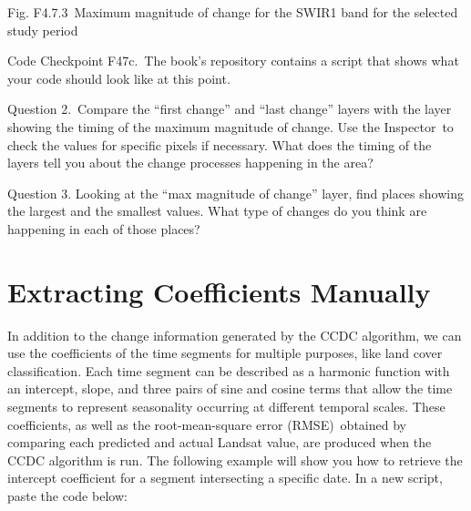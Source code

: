 \documentclass[
  letterpaper,
  DIV=11,
  numbers=noendperiod]{scrreprt}
\begin{document}
Fig. F4.7.3~Maximum magnitude of change for the SWIR1 band for the
selected study period

\begin{tcolorbox}[enhanced jigsaw, left=2mm, breakable, rightrule=.15mm, opacityback=0, colframe=quarto-callout-note-color-frame, colbacktitle=quarto-callout-note-color!10!white, arc=.35mm, opacitybacktitle=0.6, toptitle=1mm, colback=white, leftrule=.75mm, title=\textcolor{quarto-callout-note-color}{\faInfo}\hspace{0.5em}{Note}, toprule=.15mm, bottomtitle=1mm, titlerule=0mm, bottomrule=.15mm, coltitle=black]

Code Checkpoint F47c.~The book's repository contains a script that shows
what your code should look like at this point.

\end{tcolorbox}

Question 2.~Compare the ``first change'' and ``last change'' layers with
the layer showing the timing of the maximum magnitude of change. Use the
Inspector~to check the values for specific pixels if necessary. What
does the timing of the layers tell you about the change processes
happening in the area?

Question 3. Looking at the ``max magnitude of change'' layer, find
places showing the largest and the smallest values. What type of changes
do you think are happening in each of those places?

\hypertarget{extracting-coefficients-manually}{%
\section{Extracting Coefficients
Manually}\label{extracting-coefficients-manually}}

In addition to the change information generated by the CCDC algorithm,
we can use the coefficients of the time segments for multiple purposes,
like land cover classification. Each time segment can be described as a
harmonic function with an intercept, slope, and three pairs of sine and
cosine terms that allow the time segments to represent seasonality
occurring at different temporal scales. These coefficients, as well as
the root-mean-square error (RMSE)~obtained by comparing each predicted
and actual Landsat value, are produced when the CCDC algorithm is run.
The following example will show you how to retrieve the intercept
coefficient for a segment intersecting a specific date. In a new script,
paste the code below:
\end{document}
